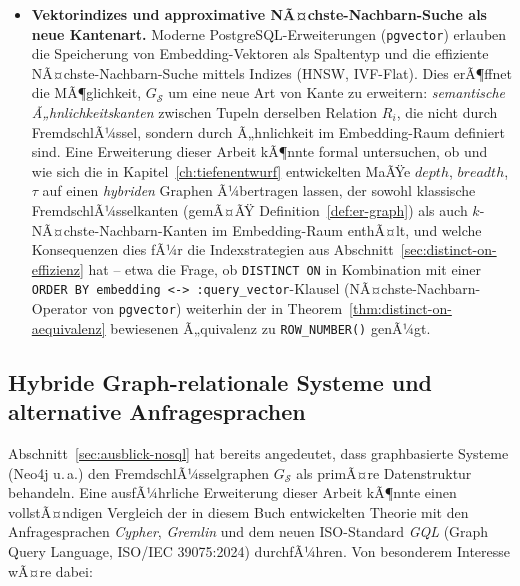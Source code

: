 ﻿\documentclass[a4paper,12pt]{report}
\theoremstyle{definition}
\theoremstyle{remark}
\newcommand{\depth}{\mathit{depth}}
\newcommand{\breadth}{\mathit{breadth}}
\begin{document}
\begin{itemize}
  \item \textbf{Vektorindizes und approximative NÃ¤chste-Nachbarn-Suche
    als neue Kantenart.} Moderne PostgreSQL-Erweiterungen
    (\texttt{pgvector}) erlauben die Speicherung von
    Embedding-Vektoren als Spaltentyp und die effiziente
    NÃ¤chste-Nachbarn-Suche mittels Indizes (HNSW, IVF-Flat). Dies
    erÃ¶ffnet die MÃ¶glichkeit, $G_{\mathcal{S}}$ um eine neue Art von
    Kante zu erweitern: \emph{semantische Ã„hnlichkeitskanten}
    zwischen Tupeln derselben Relation $R_i$, die nicht durch
    FremdschlÃ¼ssel, sondern durch Ã„hnlichkeit im
    Embedding-Raum definiert sind. Eine Erweiterung dieser Arbeit
    kÃ¶nnte formal untersuchen, ob und wie sich die in
    Kapitel~\ref{ch:tiefenentwurf} entwickelten MaÃŸe $\depth$,
    $\breadth$, $\tau$ auf einen \emph{hybriden} Graphen
    Ã¼bertragen lassen, der sowohl klassische
    FremdschlÃ¼sselkanten (gemÃ¤ÃŸ Definition~\ref{def:er-graph}) als
    auch $k$-NÃ¤chste-Nachbarn-Kanten im Embedding-Raum enthÃ¤lt, und
    welche Konsequenzen dies fÃ¼r die Indexstrategien aus
    Abschnitt~\ref{sec:distinct-on-effizienz} hat -- etwa die Frage,
    ob \texttt{DISTINCT ON} in Kombination mit einer
    \texttt{ORDER BY embedding <-> :query\_vector}-Klausel
    (NÃ¤chste-Nachbarn-Operator von \texttt{pgvector}) weiterhin der in
    Theorem~\ref{thm:distinct-on-aequivalenz} bewiesenen Ã„quivalenz
    zu \texttt{ROW\_NUMBER()} genÃ¼gt.
\end{itemize}

\subsection{Hybride Graph-relationale Systeme und alternative
Anfragesprachen}
\label{sec:ausblick-hybrid}

Abschnitt~\ref{sec:ausblick-nosql} hat bereits angedeutet, dass
graphbasierte Systeme (Neo4j u.\,a.) den FremdschlÃ¼sselgraphen
$G_{\mathcal{S}}$ als primÃ¤re Datenstruktur behandeln. Eine
ausfÃ¼hrliche Erweiterung dieser Arbeit kÃ¶nnte einen vollstÃ¤ndigen
Vergleich der in diesem Buch entwickelten Theorie mit den
Anfragesprachen \emph{Cypher}, \emph{Gremlin} und dem neuen
ISO-Standard \emph{GQL} (Graph Query Language, ISO/IEC 39075:2024)
durchfÃ¼hren. Von besonderem Interesse wÃ¤re dabei:
\end{document}
